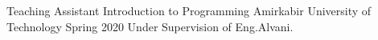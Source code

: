 

\begin{cventries}

  \cventry
    {Teaching Assistant} %
    {Introduction to Programming} %
    {Amirkabir University of Technology} %
    {Spring 2020} %
    {Under Supervision of Eng.Alvani.}


\end{cventries}